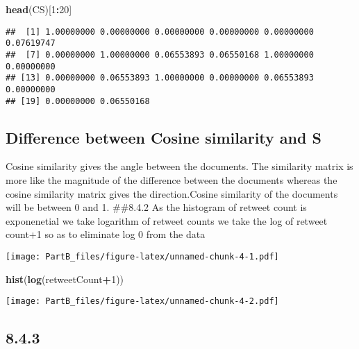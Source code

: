 \documentclass[]{article}
\newenvironment{Shaded}{\begin{snugshade}}{\end{snugshade}}
\newcommand{\KeywordTok}[1]{\textcolor[rgb]{0.13,0.29,0.53}{\textbf{#1}}}
\newcommand{\DecValTok}[1]{\textcolor[rgb]{0.00,0.00,0.81}{#1}}
\newcommand{\CommentTok}[1]{\textcolor[rgb]{0.56,0.35,0.01}{\textit{#1}}}
\newcommand{\OperatorTok}[1]{\textcolor[rgb]{0.81,0.36,0.00}{\textbf{#1}}}
\newcommand{\NormalTok}[1]{#1}
\begin{document}
\begin{Shaded}
\begin{Highlighting}[]
\KeywordTok{head}\NormalTok{(CS)[}\DecValTok{1}\OperatorTok{:}\DecValTok{20}\NormalTok{]}
\end{Highlighting}
\end{Shaded}

\begin{verbatim}
##  [1] 1.00000000 0.00000000 0.00000000 0.00000000 0.00000000 0.07619747
##  [7] 0.00000000 1.00000000 0.06553893 0.06550168 1.00000000 0.00000000
## [13] 0.00000000 0.06553893 1.00000000 0.00000000 0.06553893 0.00000000
## [19] 0.00000000 0.06550168
\end{verbatim}

\subsection{Difference between Cosine similarity and
S}\label{difference-between-cosine-similarity-and-s}

Cosine similarity gives the angle between the documents. The similarity
matrix is more like the magnitude of the difference between the
documents whereas the cosine similarity matrix gives the
direction.Cosine similarity of the documents will be between 0 and 1.
\#\#8.4.2 As the histogram of retweet count is exponenetial we take
logarithm of retweet counts we take the log of retweet count+1 so as to
eliminate log 0 from the data

\begin{Shaded}
\end{Shaded}

\texttt{[image: PartB\_files/figure-latex/unnamed-chunk-4-1.pdf]}

\begin{Shaded}
\begin{Highlighting}[]
\KeywordTok{hist}\NormalTok{(}\KeywordTok{log}\NormalTok{(retweetCount}\OperatorTok{+}\DecValTok{1}\NormalTok{))}
\end{Highlighting}
\end{Shaded}

\texttt{[image: PartB\_files/figure-latex/unnamed-chunk-4-2.pdf]}

\subsection{8.4.3}\label{section}
\end{document}
